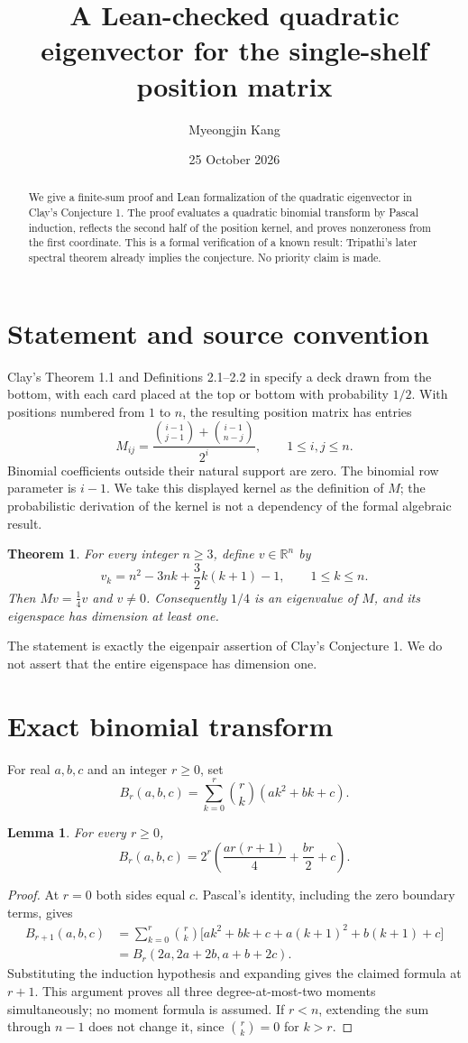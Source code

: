 \documentclass[11pt]{article}
\title{A Lean-checked quadratic eigenvector for the single-shelf position matrix}
\author{Myeongjin Kang}
\date{25 October 2026}
\newtheorem{theorem}{Theorem}
\newtheorem{lemma}{Lemma}
\begin{document}
\maketitle
\begin{abstract}
We give a finite-sum proof and Lean formalization of the quadratic eigenvector in Clay's Conjecture 1. The proof evaluates a quadratic binomial transform by Pascal induction, reflects the second half of the position kernel, and proves nonzeroness from the first coordinate. This is a formal verification of a known result: Tripathi's later spectral theorem already implies the conjecture. No priority claim is made.
\end{abstract}

\section{Statement and source convention}
Clay's Theorem 1.1 and Definitions 2.1--2.2 in \cite{clay} specify a deck drawn from the bottom, with each card placed at the top or bottom with probability $1/2$. With positions numbered from $1$ to $n$, the resulting position matrix has entries
\[
 M_{ij}=\frac{\binom{i-1}{j-1}+\binom{i-1}{n-j}}{2^i},\qquad 1\leq i,j\leq n.
\]
Binomial coefficients outside their natural support are zero. The binomial row parameter is $i-1$. We take this displayed kernel as the definition of $M$; the probabilistic derivation of the kernel is not a dependency of the formal algebraic result.

\begin{theorem}\label{thm:main}
For every integer $n\geq3$, define $v\in\mathbb R^n$ by
\[
 v_k=n^2-3nk+\frac32 k(k+1)-1,\qquad 1\leq k\leq n.
\]
Then $Mv=\tfrac14v$ and $v\ne0$. Consequently $1/4$ is an eigenvalue of $M$, and its eigenspace has dimension at least one.
\end{theorem}
The statement is exactly the eigenpair assertion of Clay's Conjecture 1. We do not assert that the entire eigenspace has dimension one.

\section{Exact binomial transform}
For real $a,b,c$ and an integer $r\geq0$, set
\[
 B_r(a,b,c)=\sum_{k=0}^r\binom rk(ak^2+bk+c).
\]
\begin{lemma}\label{lem:binomial}
For every $r\geq0$,
\[
 B_r(a,b,c)=2^r\left(\frac{ar(r+1)}4+\frac{br}2+c\right).
\]
\end{lemma}
\begin{proof}
At $r=0$ both sides equal $c$. Pascal's identity, including the zero boundary terms, gives
\begin{align*}
 B_{r+1}(a,b,c)
 &=\sum_{k=0}^r\binom rk\bigl[ak^2+bk+c+a(k+1)^2+b(k+1)+c\bigr]\\
 &=B_r(2a,2a+2b,a+b+2c).
\end{align*}
Substituting the induction hypothesis and expanding gives the claimed formula at $r+1$. This argument proves all three degree-at-most-two moments simultaneously; no moment formula is assumed. If $r<n$, extending the sum through $n-1$ does not change it, since $\binom rk=0$ for $k>r$.
\end{proof}
\end{document}
